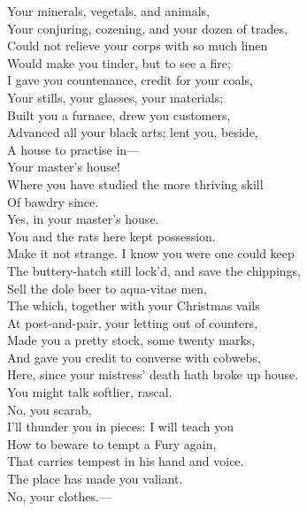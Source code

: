 \documentclass[a4paper,oneside]{memoir}
\begin{document}
\begin{drama*}
Your minerals, vegetals, and animals,\\
Your conjuring, cozening, and your dozen of trades,\\
Could not relieve your corps with so much linen\\
Would make you tinder, but to see a fire;\\
I gave you countenance, credit for your coals,\\
Your stills, your glasses, your materials;\\
Built you a furnace, drew you customers,\\
Advanced all your black arts; lent you, beside,\\
A house to practise in---\\
\subtlespeaks {} Your master's house!\\
\facespeaks Where you have studied the more thriving skill\\
Of bawdry since.\\
\subtlespeaks {} Yes, in your master's house.\\
You and the rats here kept possession.\\
Make it not strange. I know you were one could keep\\
The buttery-hatch still lock'd, and save the chippings,\\
Sell the dole beer to aqua-vitae men,\\
The which, together with your Christmas vails\\
At post-and-pair, your letting out of counters,\\
Made you a pretty stock, some twenty marks,\\
And gave you credit to converse with cobwebs,\\
Here, since your mistress' death hath broke up house.\\
\facespeaks You might talk softlier, rascal.\\
\subtlespeaks {} No, you scarab,\\
I'll thunder you in pieces: I will teach you\\
How to beware to tempt a Fury again,\\
That carries tempest in his hand and voice.\\
\facespeaks The place has made you valiant.\\
\subtlespeaks {} No, your clothes.---\\

\end{drama*}
\end{document}
